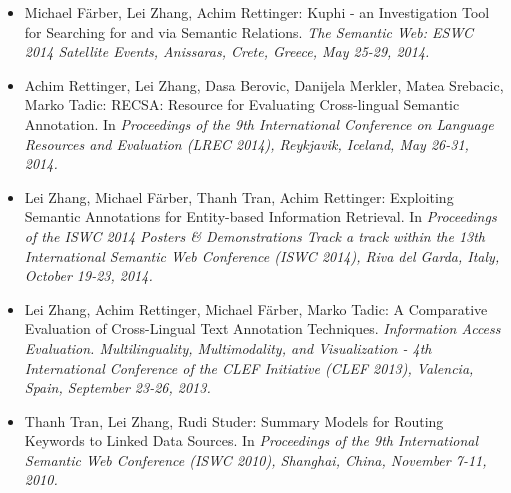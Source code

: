 \begin{itemize}
    \item Michael Färber, Lei Zhang, Achim Rettinger: Kuphi - an Investigation Tool for Searching for and via Semantic Relations. \emph{The Semantic Web: ESWC 2014 Satellite Events, Anissaras, Crete, Greece, May 25-29, 2014.}~\cite{DBLP:conf/esws/Farber0R14}
    \item 	Achim Rettinger, Lei Zhang, Dasa Berovic, Danijela Merkler, Matea Srebacic, Marko Tadic: RECSA: Resource for Evaluating Cross-lingual Semantic Annotation. In \emph{Proceedings of the 9th International Conference on Language Resources and Evaluation (LREC 2014), Reykjavik, Iceland, May 26-31, 2014.}~\cite{DBLP:conf/lrec/RettingerZBMST14}
    \item Lei Zhang, Michael Färber, Thanh Tran, Achim Rettinger: Exploiting Semantic Annotations for Entity-based Information Retrieval. In \emph{Proceedings of the ISWC 2014 Posters \& Demonstrations Track a track within the 13th International Semantic Web Conference (ISWC 2014), Riva del Garda, Italy, October 19-23, 2014.}~\cite{DBLP:conf/semweb/0007FTR14}
    \item Lei Zhang, Achim Rettinger, Michael Färber, Marko Tadic: A Comparative Evaluation of Cross-Lingual Text Annotation Techniques. \emph{Information Access Evaluation. Multilinguality, Multimodality, and Visualization - 4th International Conference of the CLEF Initiative (CLEF 2013), Valencia, Spain, September 23-26, 2013.}~\cite{DBLP:conf/clef/ZhangRFT13}
    \item Thanh Tran, Lei Zhang, Rudi Studer: Summary Models for Routing Keywords to Linked Data Sources. In \emph{Proceedings of the 9th International Semantic Web Conference (ISWC 2010), Shanghai, China, November 7-11, 2010.}~\cite{DBLP:conf/semweb/TranZS10}
\end{itemize}


